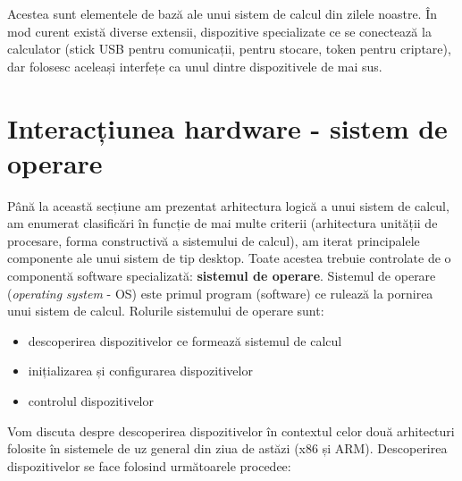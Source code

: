 Acestea sunt elementele de bază ale unui sistem de calcul din zilele noastre. În
mod curent există diverse extensii, dispozitive specializate ce se conectează la
calculator (stick USB pentru comunicații, pentru stocare, token pentru
criptare), dar folosesc aceleași interfețe ca unul dintre dispozitivele de mai sus.

\section{Interacțiunea hardware - sistem de operare}
\label{sec:hw:os-interact}

Până la această secțiune am prezentat arhitectura logică a unui sistem de
calcul, am enumerat clasificări în funcție de mai multe criterii (arhitectura
unității de procesare, forma constructivă a sistemului de calcul), am iterat
principalele componente ale unui sistem de tip desktop. Toate acestea trebuie
controlate de o componentă software specializată: \textbf{sistemul de operare}.
Sistemul de operare (\textit{operating system} - OS) este primul program
(software) ce rulează la pornirea unui sistem de calcul. Rolurile sistemului de
operare sunt:

\begin{itemize}
  \item descoperirea dispozitivelor ce formează sistemul de calcul
  \item inițializarea și configurarea dispozitivelor
  \item controlul dispozitivelor
\end{itemize}

Vom discuta despre descoperirea dispozitivelor în contextul celor două
arhitecturi folosite în sistemele de uz general din ziua de astăzi (x86 și ARM).
Descoperirea dispozitivelor se face folosind următoarele procedee:

